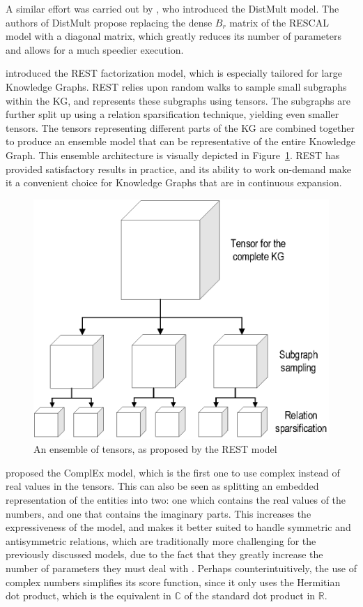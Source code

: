 A similar effort was carried out by \citet{yang2014}, who introduced the DistMult model. The authors of DistMult propose replacing the dense $B_r$ matrix of the RESCAL model with a diagonal matrix, which greatly reduces its number of parameters and allows for a much speedier execution.

\citet{tay2017} introduced the REST factorization model, which is especially tailored for large Knowledge Graphs. REST relies upon random walks to sample small subgraphs within the KG, and represents these subgraphs using tensors. The subgraphs are further split up using a relation sparsification technique, yielding even smaller tensors. The tensors representing different parts of the KG are combined together to produce an ensemble model that can be representative of the entire Knowledge Graph. This ensemble architecture is visually depicted in Figure~\ref{fig:emb-ensemble}. REST has provided satisfactory results in practice, and its ability to work on-demand make it a convenient choice for Knowledge Graphs that are in continuous expansion.

\begin{figure}[!htp]
    \centering
    \includegraphics[width=.7\textwidth]{fig/embedding/ensemble}
    \caption{An ensemble of tensors, as proposed by the REST model}
    \label{fig:emb-ensemble}
\end{figure}


\citet{trouillon2016} proposed the ComplEx model, which is the first one to use complex instead of real values in the tensors. This can also be seen as splitting an embedded representation of the entities into two: one which contains the real values of the numbers, and one that contains the imaginary parts. This increases the expressiveness of the model, and makes it better suited to handle symmetric and antisymmetric relations, which are traditionally more challenging for the previously discussed models, due to the fact that they greatly increase the number of parameters they must deal with \cite{nickel2011, socher2013}. Perhaps counterintuitively, the use of complex numbers simplifies its score function, since it only uses the Hermitian dot product, which is the equivalent in $\mathbb{C}$ of the standard dot product in $\mathbb{R}$.\newpage

